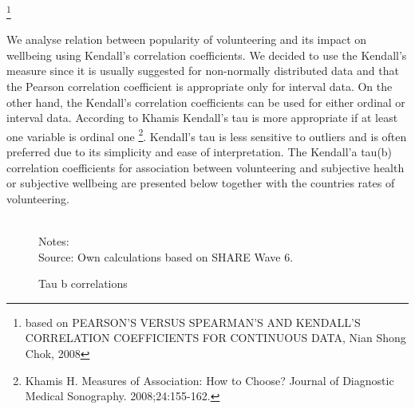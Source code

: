 \documentclass[10pt, letterpaper]{article}
\begin{document}
\begin{spacing}{1.4}
\footnote{based on PEARSON'S VERSUS SPEARMAN'S AND KENDALL'S CORRELATION COEFFICIENTS FOR CONTINUOUS DATA, Nian Shong Chok, 2008}

We analyse relation between popularity of volunteering and its impact on wellbeing using Kendall's correlation coefficients. We decided to use the Kendall's measure since it is usually suggested for non-normally distributed data and that the Pearson correlation coefficient is appropriate only for interval data. On the other hand, the Kendall's correlation coefficients can be used for either ordinal or interval data. According to Khamis  Kendall's tau is more appropriate if at least one variable is ordinal one \footnote{Khamis H. Measures of Association: How to Choose? Journal of Diagnostic Medical Sonography. 2008;24:155-162.}. Kendall's tau is less sensitive to outliers and is often preferred due to its simplicity and ease of interpretation. The Kendall'a tau(b) correlation coefficients for association between volunteering and subjective health or subjective wellbeing  are presented below together with the countries rates of volunteering.


\begin{figure}[H]
\centering
\caption{Tau b correlations} 
\label{fig:taub}
\begin{minipage}{1\linewidth}
\quad
{}~\\
{\footnotesize Notes: }~\\
{\footnotesize Source: Own calculations based on SHARE Wave 6.}
\end{minipage}
\end{figure} 


\end{spacing}
\end{document}
